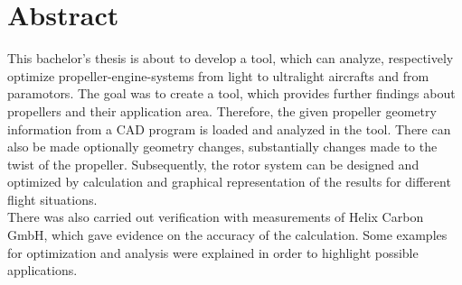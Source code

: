 \section*{Abstract}
\label{sec:abstract}

This bachelor’s thesis is about to develop a tool, which can analyze, respectively optimize propeller-engine-systems from light to ultralight aircrafts and from paramotors. The goal was to create a tool, which provides further findings about propellers and their application area. Therefore, the given propeller geometry information from a CAD program is loaded and analyzed in the tool. There can also be made optionally geometry changes, substantially changes made to the twist of the propeller. Subsequently, the rotor system can be designed and optimized by calculation and graphical representation of the results for different flight situations.\\


There was also carried out verification with measurements of Helix Carbon GmbH, which gave evidence on the accuracy of the calculation. Some examples for optimization and analysis were explained in order to highlight possible applications.



